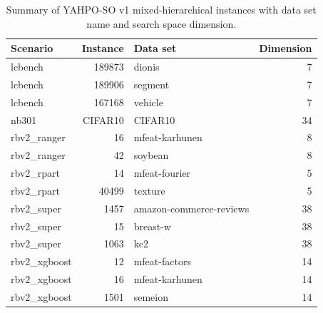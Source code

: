 \begin{table}[H]
  \centering
  \caption{Summary of YAHPO-SO v1 mixed-hierarchical instances with data set name and search space dimension.}
  \label{tab:mixed_instances}
  \begin{tabular}{lrlr}
    \toprule
    Scenario      & Instance & Data set                & Dimension \\
    \midrule
    lcbench       & 189873   & dionis                  & 7         \\
    lcbench       & 189906   & segment                 & 7         \\
    lcbench       & 167168   & vehicle                 & 7         \\
    nb301         & CIFAR10  & CIFAR10                 & 34        \\
    rbv2\_ranger  & 16       & mfeat-karhunen          & 8         \\
    rbv2\_ranger  & 42       & soybean                 & 8         \\
    rbv2\_rpart   & 14       & mfeat-fourier           & 5         \\
    rbv2\_rpart   & 40499    & texture                 & 5         \\
    rbv2\_super   & 1457     & amazon-commerce-reviews & 38        \\
    rbv2\_super   & 15       & breast-w                & 38        \\
    rbv2\_super   & 1063     & kc2                     & 38        \\
    rbv2\_xgboost & 12       & mfeat-factors           & 14        \\
    rbv2\_xgboost & 16       & mfeat-karhunen          & 14        \\
    rbv2\_xgboost & 1501     & semeion                 & 14        \\
    \bottomrule
  \end{tabular}
\end{table}